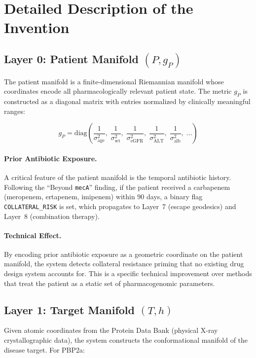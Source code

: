 \documentclass[11pt]{article}
\begin{document}
\section{Detailed Description of the Invention}

\subsection{Layer 0: Patient Manifold $(P, g_P)$}

The patient manifold is a finite-dimensional Riemannian manifold whose coordinates encode
all pharmacologically relevant patient state. The metric $g_P$ is constructed as a
diagonal matrix with entries normalized by clinically meaningful ranges:

\begin{equation}
g_P = \text{diag}\!\left(\frac{1}{\sigma_{\text{age}}^2},\;
\frac{1}{\sigma_{\text{wt}}^2},\;
\frac{1}{\sigma_{\text{eGFR}}^2},\;
\frac{1}{\sigma_{\text{ALT}}^2},\;
\frac{1}{\sigma_{\text{alb}}^2},\;
\ldots\right)
\end{equation}

\paragraph{Prior Antibiotic Exposure.}
A critical feature of the patient manifold is the temporal antibiotic history. Following the
``Beyond \texttt{mecA}'' finding, if the patient received a carbapenem (meropenem, ertapenem,
imipenem) within 90 days, a binary flag \texttt{COLLATERAL\_RISK} is set, which propagates
to Layer~7 (escape geodesics) and Layer~8 (combination therapy).

\paragraph{Technical Effect.}
By encoding prior antibiotic exposure as a geometric coordinate on the patient manifold,
the system detects collateral resistance priming that no existing drug design system
accounts for. This is a specific technical improvement over methods that treat the patient
as a static set of pharmacogenomic parameters.

\subsection{Layer 1: Target Manifold $(T, h)$}

Given atomic coordinates from the Protein Data Bank (physical X-ray crystallographic data),
the system constructs the conformational manifold of the disease target. For PBP2a:
\end{document}
